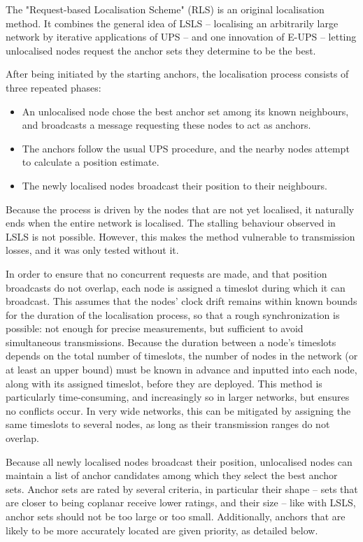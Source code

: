 \documentclass[12pt,a4paper,fleqn]{report}
\begin{document}
The "Request-based Localisation Scheme" (RLS) is an original localisation method. It combines the general idea of LSLS – localising an arbitrarily large network by iterative applications of UPS – and one innovation of E-UPS – letting unlocalised nodes request the anchor sets they determine to be the best.

After being initiated by the starting anchors, the localisation process consists of three repeated phases:
\begin{itemize}
	\itemsep0em
	\item An unlocalised node chose the best anchor set among its known neighbours, and broadcasts a message requesting these nodes to act as anchors.
	\item The anchors follow the usual UPS procedure, and the nearby nodes attempt to calculate a position estimate.
	\item The newly localised nodes broadcast their position to their neighbours.
\end{itemize}
Because the process is driven by the nodes that are not yet localised, it naturally ends when the entire network is localised. The stalling behaviour observed in LSLS is not possible. However, this makes the method vulnerable to transmission losses, and it was only tested without it.

In order to ensure that no concurrent requests are made, and that position broadcasts do not overlap, each node is assigned a timeslot during which it can broadcast. This assumes that the nodes' clock drift remains within known bounds for the duration of the localisation process, so that a rough synchronization is possible: not enough for precise measurements, but sufficient to avoid simultaneous transmissions. Because the duration between a node's timeslots depends on the total number of timeslots, the number of nodes in the network (or at least an upper bound) must be known in advance and inputted into each node, along with its assigned timeslot, before they are deployed. This method is particularly time-consuming, and increasingly so in larger networks, but ensures no conflicts occur. In very wide networks, this can be mitigated by assigning the same timeslots to several nodes, as long as their transmission ranges do not overlap.

Because all newly localised nodes broadcast their position, unlocalised nodes can maintain a list of anchor candidates among which they select the best anchor sets. Anchor sets are rated by several criteria, in particular their shape – sets that are closer to being coplanar receive lower ratings, and their size – like with LSLS, anchor sets should not be too large or too small. Additionally, anchors that are likely to be more accurately located are given priority, as detailed below.
\end{document}
